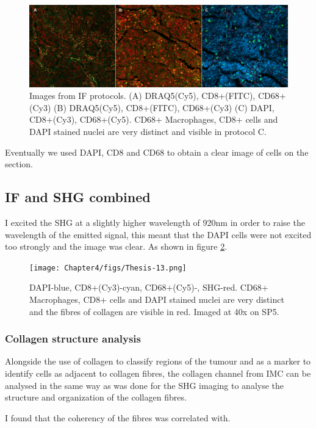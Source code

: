 \begin{figure}
    \centering
    \includegraphics[width=\textwidth]{Chapter4/figs/Thesis-14.png}
    \caption[Images from IF protocols.]{Images from IF protocols. (A) DRAQ5(Cy5), CD8+(FITC), CD68+(Cy3) (B)  DRAQ5(Cy5), CD8+(FITC), CD68+(Cy3)  (C) DAPI, CD8+(Cy3), CD68+(Cy5). CD68+ Macrophages, CD8+ cells and DAPI stained nuclei are very distinct and visible in protocol C.}
    \label{fig:IF_protos}
\end{figure}

Eventually we used DAPI, CD8 and CD68 to obtain a clear image of cells on the section. 

\subsection{IF and SHG combined}
I excited the SHG at a slightly higher wavelength of 920nm in order to raise the wavelength of the emitted signal, this meant that the DAPI cells were not excited too strongly and the image was clear. As shown in figure \ref{fig:SHG_IF}. 
\begin{figure}
    \centering
    \texttt{[image: Chapter4/figs/Thesis-13.png]}
    \caption[Images measuring IF and SHG signal.]{ DAPI-blue, CD8+(Cy3)-cyan, CD68+(Cy5)-, SHG-red. CD68+ Macrophages, CD8+ cells and DAPI stained nuclei are very distinct and the fibres of collagen are visible in red. Imaged at 40x on SP5.}
    \label{fig:SHG_IF}
\end{figure}

\subsubsection{Collagen structure analysis}
Alongside the use of collagen to classify regions of the tumour and as a marker to identify cells as adjacent to collagen fibres, the collagen channel from IMC can be analysed in the same way as was done for the SHG imaging to analyse the structure and organization of the collagen fibres.

I found that the coherency of the fibres was correlated with. 

